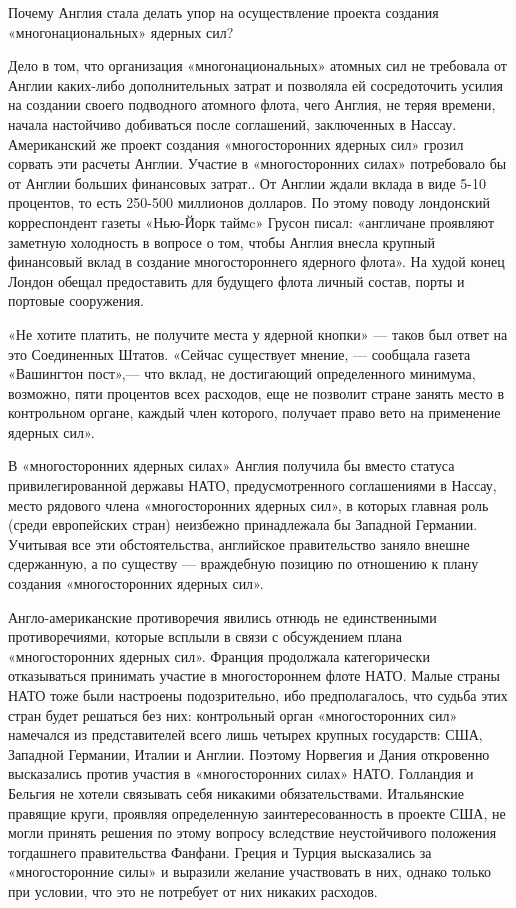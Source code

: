 \documentclass[12pt, a4paper, openany]{book}
\begin{document}
Почему Англия стала делать упор на осуществление проекта создания «многонациональных» ядерных сил?

Дело в том, что организация «многонациональных» атомных сил не требовала от Англии каких-либо дополнительных затрат и позволяла ей сосредоточить усилия на создании своего подводного атомного флота, чего Англия, не теряя времени, начала настойчиво добиваться после соглашений, заключенных в Нассау. Американский же проект создания «многосторонних ядерных сил» грозил сорвать эти расчеты Англии. Участие в «многосторонних силах» потребовало бы от Англии больших финансовых затрат.. От Англии ждали вклада в виде 5-10 процентов, то есть 250-500 миллионов долларов. По этому поводу лондонский корреспондент газеты «Нью-Йорк таймc» Грусон писал: «англичане проявляют заметную холодность в вопросе о том, чтобы Англия внесла крупный финансовый вклад в создание многостороннего ядерного флота». На худой конец Лондон обещал предоставить для будущего флота личный состав, порты и портовые сооружения.

«Не хотите платить, не получите места у ядерной кнопки» — таков был ответ на это Соединенных Штатов. «Сейчас существует мнение, — сообщала газета «Вашингтон пост»,— что вклад, не достигающий определенного минимума, возможно, пяти процентов всех расходов, еще не позволит стране занять место в контрольном органе, каждый член которого, получает право вето на применение ядерных сил».

В «многосторонних ядерных силах» Англия получила бы вместо статуса привилегированной державы НАТО, предусмотренного соглашениями в Нассау, место рядового члена «многосторонних ядерных сил», в которых главная роль (среди европейских стран) неизбежно принадлежала бы Западной Германии. Учитывая все эти обстоятельства, английское правительство заняло внешне сдержанную, а по существу — враждебную позицию по отношению к плану создания «многосторонних ядерных сил».

Англо-американские противоречия явились отнюдь не единственными противоречиями, которые всплыли в связи с обсуждением плана «многосторонних ядерных сил». Франция продолжала категорически отказываться принимать участие в многостороннем флоте НАТО. Малые страны НАТО тоже были настроены подозрительно, ибо предполагалось, что судьба этих стран будет решаться без них: контрольный орган «многосторонних сил» намечался из представителей всего лишь четырех крупных государств: США, Западной Германии, Италии и Англии. Поэтому Норвегия и Дания откровенно высказались против участия в «многосторонних силах» НАТО. Голландия и Бельгия не хотели связывать себя никакими обязательствами. Итальянские правящие круги, проявляя определенную заинтересованность в проекте США, не могли принять решения по этому вопросу вследствие неустойчивого положения тогдашнего правительства Фанфани. Греция и Турция высказались за «многосторонние силы» и выразили желание участвовать в них, однако только при условии, что это не потребует от них никаких расходов.
\end{document}
